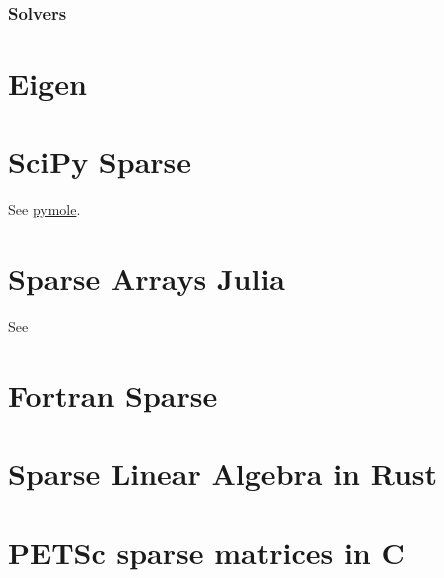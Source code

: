 \subsubsection{Solvers}

\section{Eigen}

\section{SciPy Sparse~\textcolor{blue}{}}

See \href{https://github.com/nutrik/pymole}{pymole}.

\section{Sparse Arrays Julia}

See \href{https://robertsweeneyblanco.github.io/Programming_for_Mathematical_Applications/content/Sparse_Matrices/Sparse_Matrices_In_Julia.html}{}

\section{Fortran Sparse}

\section{Sparse Linear Algebra in Rust~}


\section{PETSc sparse matrices in C}
